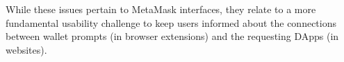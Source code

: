 \documentclass[conference]{IEEEtran}
\begin{document}
While these issues pertain to MetaMask interfaces, they relate to a more fundamental usability challenge to keep users informed about the connections between wallet prompts (in browser extensions) and the requesting DApps (in websites).


\end{document}
